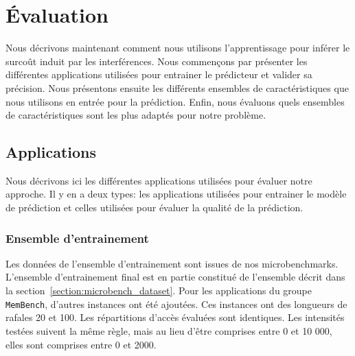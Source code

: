 %

\section{Évaluation}

Nous décrivons maintenant comment nous utilisons l'apprentissage pour inférer le surcoût induit par les interférences.
Nous commençons par présenter les différentes applications utilisées pour entrainer le prédicteur et valider sa précision.
Nous présentons ensuite les différents ensembles de caractéristiques que nous utilisons en entrée pour la prédiction.
Enfin, nous évaluons quels ensembles de caractéristiques sont les plus adaptés pour notre problème.

\subsection{Applications}

Nous décrivons ici les différentes applications utilisées pour évaluer notre approche.
Il y en a deux types: les applications utilisées pour entrainer le modèle de prédiction et celles utilisées pour évaluer la qualité de la prédiction.

\subsubsection{Ensemble d'entrainement}

Les données de l'ensemble d'entrainement sont issues de nos microbenchmarks.
L'ensemble d'entrainement final est en partie constitué de l'ensemble décrit dans la section~\ref{section:microbench_dataset}.
Pour les applications du groupe \texttt{MemBench}, d'autres instances ont été ajoutées.
Ces instances ont des longueurs de rafales 20 et 100.
Les répartitions d'accès évaluées sont identiques.
Les intensités testées suivent la même règle, mais au lieu d'être comprises entre 0 et 10 000, elles sont comprises entre 0 et 2000.


